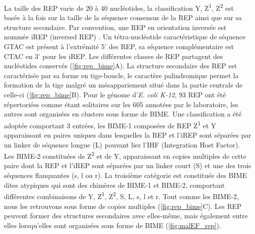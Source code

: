 \documentclass[12pt,a4paper]{report}
\begin{document}
\begin{onehalfspace}
La taille des REP varie de 20 à 40 nucléotides, la classification Y, Z\textsuperscript{1}, Z\textsuperscript{2} est basée à la fois sur la taille de la séquence consensus de la REP ainsi que sur sa structure secondaire. Par convention, une REP en orientation inversée est nommée iREP (inversed REP) \citep{Ton-Hoang2012}. Un tétra-nucléotide caractéristique de séquence GTAC est présent à l'extrémité 5' des REP, sa séquence complémentaire est CTAC en 3' pour les iREP. Les différentes classes de REP partagent des nucléotides conservés (\autoref{fig:rep_bime}A). La structure secondaire des REP est caractérisée par sa forme en tige-boucle, le caractère palindromique permet la formation de la tige malgré un mésappariement situé dans la partie centrale de celle-ci (\autoref{fig:rep_bime}B). Pour le génome d'\textit{E. coli K-12}, 93 REP ont été répertoriées comme étant solitaires sur les 605 annotées par le laboratoire, les autres sont organisées en clusters sous forme de BIME. Une classification a été adoptée comportant 3 entrées, les BIME-1 composées de REP Z\textsuperscript{1} et Y apparaissant en paires uniques dans lesquelles la REP et l'iREP sont séparées par un linker de séquence longue (L) pouvant lier l'IHF (Integration Host Factor). Les BIME-2 constituées de Z\textsuperscript{2} et de Y, apparaissant en copies multiples de cette paire dont la REP et l'iREP sont séparées par un linker court (S) et une des trois séquences flanquantes (s, l ou r). La troisième catégorie est constituée des BIME dites atypiques qui sont des chimères de BIME-1 et BIME-2, comportant différentes combinaisons de Y, Z\textsuperscript{1}, Z\textsuperscript{2}, S, L, s, l et r. Tout comme les BIME-2, nous les retrouvons sous forme de copies multiples (\autoref{fig:rep_bime}C). Les REP peuvent former des structures secondaires avec elles-même, mais également entre elles lorsqu'elles sont organisées sous forme de BIME (\autoref{fig:malEF_rep}).


\end{onehalfspace}
\end{document}
